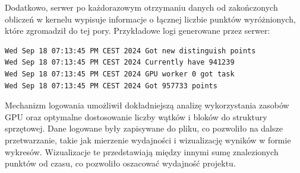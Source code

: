 Dodatkowo, serwer po każdorazowym otrzymaniu danych od zakończonych obliczeń
w kernelu wypisuje informacje o łącznej liczbie punktów wyróżnionych, które
zgromadził do tej pory. Przykładowe logi generowane przez serwer:
\begin{verbatim}
Wed Sep 18 07:13:45 PM CEST 2024 Got new distinguish points
Wed Sep 18 07:13:45 PM CEST 2024 Currently have 941239
Wed Sep 18 07:13:45 PM CEST 2024 GPU worker 0 got task
Wed Sep 18 07:13:45 PM CEST 2024 Got 957733 points
\end{verbatim}

Mechanizm logowania umożliwił dokładniejszą analizę wykorzystania zasobów GPU oraz
optymalne dostosowanie liczby wątków i bloków do struktury sprzętowej. Dane logowane
były zapisywane do pliku, co pozwoliło na dalsze przetwarzanie, takie jak mierzenie
wydajności i wizualizację wyników w formie wykresów. Wizualizacje te przedstawiają
między innymi sumę znalezionych punktów od czasu,
co pozwoliło oszacować wydajność projektu.
